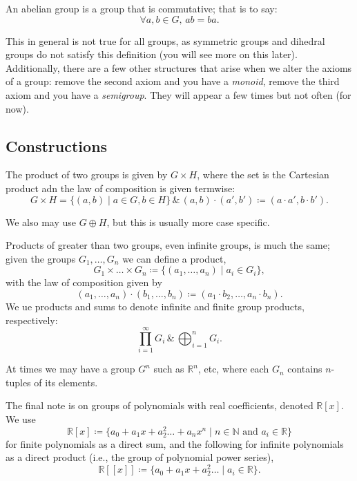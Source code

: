 \documentclass{article}
\begin{document}
\begin{definition}
  An abelian group is a group that is commutative; that is to say:
  \begin{displaymath}
    \forall a,b \in  G, \, ab=ba.
  \end{displaymath}
  
\end{definition}

This in general is not true for all groups, as symmetric groups and dihedral groups do not satisfy this definition (you will see more on this later). Additionally, there are a few other structures that arise when we alter the axioms of a group: remove the second axiom and you have a \textit{monoid}, remove the third axiom and you have a \textit{semigroup}. They will appear a few times but not often (for now).

\subsection{Constructions}

\begin{definition}
  The product of two groups is given by \( G\times H \), where the set is the Cartesian product adn the law of composition is given termwise:
  \begin{displaymath}
    G\times H = \{(a,b)\mid a \in G,b\in H\} \, \& \, (a,b)\cdot (a',b')\coloneqq (a\cdot a',b\cdot b').
  \end{displaymath}
  
\end{definition}
We also may use \( G\oplus H \), but this is usually more case specific. 

Products of greater than two groups, even infinite groups, is much the same; given the groups \(G_{1},\ldots ,G_n\) we can define a product, \[ G_{1}\times \ldots \times G_n \coloneqq  \{ (a_{1},\ldots ,a_n) \mid  a_i \in  G_i \},\] with the law of composition given by \[ (a_{1},\ldots ,a_n)\cdot (b_{1},\ldots ,b_n)\coloneqq (a_{1}\cdot b_{2},\ldots ,a_n \cdot b_n).\] 
We ue products and sums to denote infinite and finite group products, respectively:\[
  \prod^{\infty}_{i=1} G_i \, \& \, \bigoplus_{i=1}^n G_i
.\] 

At times we may have a group \( G^n \) such as \( \mathbb{R}^n \), etc, where each \( G_n \) contains \( n \)-tuples of its elements. 

The final note is on groups of polynomials with real coefficients, denoted \( \mathbb{R}[x] \). We use \[
  \mathbb{R}[x] \coloneqq \{ a_{0}+a_{1}x+a_{2}^2\ldots +a_nx^n \mid  n \in  \mathbb{N} \text{ and } a_i \in  \mathbb{R} \}\]  for finite polynomials as a direct sum, and the following for infinite polynomials as a direct product (i.e., the group of polynomial power series), \[
  \mathbb{R}[[x]] \coloneqq \{ a_{0}+a_{1}x+a_{2}^2\ldots \mid a_i \in  \mathbb{R} \}
  .\] 
\end{document}
